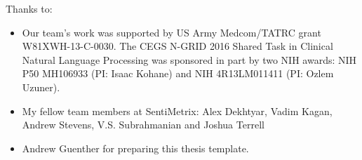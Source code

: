 \noindent
Thanks to:
\begin{itemize}
    \item Our team's work was supported by US Army Medcom/TATRC grant W81XWH-13-C-0030.
The CEGS N-GRID 2016 Shared Task in Clinical Natural Language Processing
 was sponsored in part by two NIH awards: NIH P50 MH106933 (PI: Isaac Kohane) and
NIH 4R13LM011411 (PI: Ozlem Uzuner).
    \item My fellow team members at SentiMetrix: Alex Dekhtyar, Vadim Kagan, Andrew Stevens, V.S. Subrahmanian and Joshua Terrell
    \item Andrew Guenther for preparing this thesis template.
\end{itemize}
